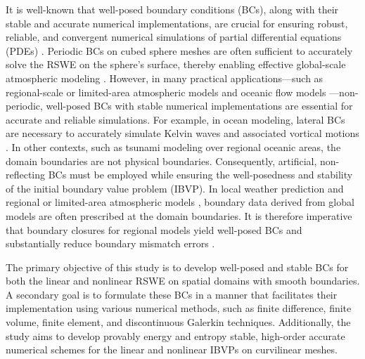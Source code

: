 \documentclass{article}
\numberwithin{equation}{section}
\theoremstyle{definition}
\begin{document}
It is well-known that well-posed boundary conditions (BCs), along with their stable and accurate numerical implementations, are crucial for ensuring robust, reliable, and convergent numerical simulations of partial differential equations (PDEs) \cite{HEW2025113624,nordstrom2022linear,gustafsson1995time,kreiss1974finite}. 
%
Periodic BCs on cubed sphere meshes are often sufficient to accurately solve the RSWE on the sphere’s surface, thereby enabling effective global-scale atmospheric modeling \cite{thuburn2012framework,shipton2018higher,lee2018mixed,ricardo2023conservation}. However, in many practical applications—such as regional-scale or limited-area atmospheric models \cite{DaviesTerry2014, Baumhefner01011982,Caron2013,TermoniaDeckmynHamdi2009,williamson1992standard} and oceanic flow models \cite{zeitlin2018geophysical}—non-periodic, well-posed BCs with stable numerical implementations are essential for accurate and reliable simulations. For example, in ocean modeling, lateral BCs are necessary to accurately simulate Kelvin waves and associated vortical motions \cite{hsieh1983free,beletsky1997numerical}.
%
In other contexts, such as tsunami modeling over regional oceanic areas, the domain boundaries are not physical boundaries. Consequently, artificial, non-reflecting BCs must be employed while ensuring the well-posedness and stability of the initial boundary value problem (IBVP). In local weather prediction and regional or limited-area atmospheric models \cite{DaviesTerry2014, Baumhefner01011982,Caron2013,TermoniaDeckmynHamdi2009,williamson1992standard}, boundary data derived from global models are often prescribed at the domain boundaries. It is therefore imperative that boundary closures for regional models yield well-posed BCs and substantially reduce boundary mismatch errors \cite{DaviesTerry2014, Baumhefner01011982,Caron2013}.
%  


The primary objective of this study is to develop well-posed and stable BCs for both the linear and nonlinear RSWE on spatial domains with smooth boundaries. A secondary goal is to formulate these BCs in a manner that facilitates their implementation using various numerical methods, such as finite difference, finite volume, finite element, and discontinuous Galerkin techniques. Additionally, the study aims to develop provably energy and entropy stable, high-order accurate numerical schemes for the linear and nonlinear IBVPs on curvilinear meshes.
% 
\end{document}
